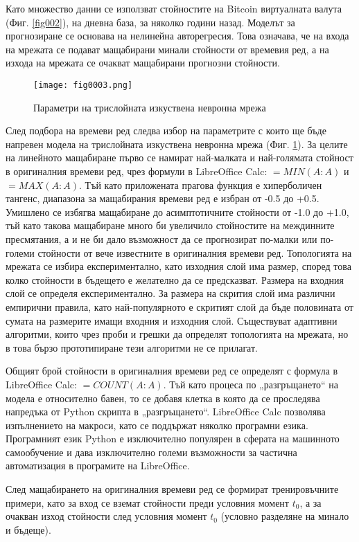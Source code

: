 Като множество данни се използват стойностите на Bitcoin виртуалната валута (Фиг. \ref{fig002}), на дневна база, за няколко години назад. Моделът за прогнозиране се основава на нелинейна авторегресия. Това означава, че на входа на мрежата се подават мащабирани минали стойности от времевия ред, а на изхода на мрежата се очакват мащабирани прогнозни стойности. 

\begin{figure}[H]
  \centering
  \texttt{[image: fig0003.png]}
  \caption{Параметри на трислойната изкуствена невронна мрежа}
\label{fig003}
\end{figure}

След подбора на времеви ред следва избор на параметрите с които ще бъде напревен модела на трислойната изкуствена невронна мрежа (Фиг. \ref{fig003}). За целите на линейното мащабиране първо се намират най-малката и най-голямата стойност в оригиналния времеви ред, чрез формули в LibreOffice Calc: $=MIN(A:A)$ и $=MAX(A:A)$. Тъй като приложената прагова функция е хиперболичен тангенс, диапазона за мащабирания времеви ред е избран от -0.5 до +0.5. Умишлено се избягва мащабиране до асимптотичните стойности от -1.0 до +1.0, тъй като такова мащабиране много би увеличило стойностите на междинните пресмятания, а и не би дало възможност да се прогнозират по-малки или по-големи стойности от вече известните в оригиналния времеви ред. Топологията на мрежата се избира експериментално, като изходния слой има размер, според това колко стойности в бъдещето е желателно да се предсказват. Размера на входния слой се определя експериментално. За размера на скрития слой има различни емпирични правила, като най-популярното е скритият слой да бъде половината от сумата на размерите имащи входния и изходния слой. Съществуват адаптивни алгоритми, които чрез проби и грешки да определят топологията на мрежата, но в това бързо прототипиране тези алгоритми не се прилагат. 

Общият брой стойности в оригиналния времеви ред се определят с формула в LibreOffice Calc: $=COUNT(A:A)$. Тъй като процеса по „разгръщането“ на модела е относително бавен, то се добавя клетка в която да се проследява напредъка от Python скрипта в „разгръщането“. LibreOffice Calc позволява изпълнението на макроси, като се поддържат няколко програмни езика. Програмният език Python е изключително популярен в сферата на машинното самообучение и дава изключително големи възможности за частична автоматизация в програмите на LibreOffice.

След мащабирането на оригиналния времеви ред се формират тренировъчните примери, като за вход се вземат стойности преди условния момент $t_0$, а за очакван изход стойности след условния момент $t_0$ (условно разделяне на минало и бъдеще).

